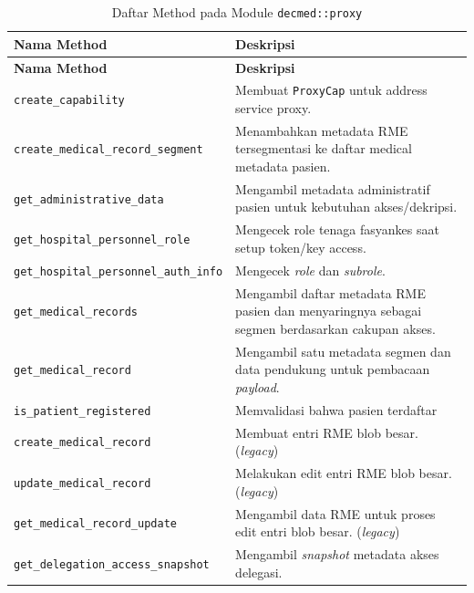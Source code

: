 \documentclass[bahasa, 12pt, a4paper, onecolumn, oneside, final]{report}
\begin{document}
\begin{longtable}{|Y{0.45\textwidth}|Y{0.47\textwidth}|}
	\caption{Daftar Method pada Module \texttt{decmed::proxy}}
	\label{tab:daftar-method-decmed-proxy}                                                                                                          \\
	\hline
	\textbf{Nama Method}                          & \textbf{Deskripsi}                                                                              \\
	\hline
	\endfirsthead
	\hline
	\textbf{Nama Method}                          & \textbf{Deskripsi}                                                                              \\
	\hline
	\endhead

	\texttt{create\_capability}                   & Membuat \texttt{ProxyCap} untuk address service proxy.                                          \\ \hline
	\texttt{create\_medical\_record\_segment}     & Menambahkan metadata RME tersegmentasi ke daftar medical metadata pasien.                       \\ \hline
	\texttt{get\_administrative\_data}            & Mengambil metadata administratif pasien untuk kebutuhan akses/dekripsi.                         \\ \hline
	\texttt{get\_hospital\_personnel\_role}       & Mengecek role tenaga fasyankes saat setup token/key access.                                     \\ \hline
	\texttt{get\_hospital\_personnel\_auth\_info} & Mengecek \textit{role} dan \textit{subrole}.                                                    \\ \hline
	\texttt{get\_medical\_records}                & Mengambil daftar metadata RME pasien dan menyaringnya sebagai segmen berdasarkan cakupan akses. \\ \hline
	\texttt{get\_medical\_record}                 & Mengambil satu metadata segmen dan data pendukung untuk pembacaan \textit{payload}.             \\ \hline
	\texttt{is\_patient\_registered}              & Memvalidasi bahwa pasien terdaftar                                                              \\ \hline
	\texttt{create\_medical\_record}              & Membuat entri RME blob besar. (\textit{legacy})                                                 \\ \hline
	\texttt{update\_medical\_record}              & Melakukan edit entri RME blob besar. (\textit{legacy})                                          \\ \hline
	\texttt{get\_medical\_record\_update}         & Mengambil data RME untuk proses edit entri blob besar. (\textit{legacy})                        \\ \hline
	\texttt{get\_delegation\_access\_snapshot}    & Mengambil \textit{snapshot} metadata akses delegasi.                                            \\ \hline
\end{longtable}
\end{document}
